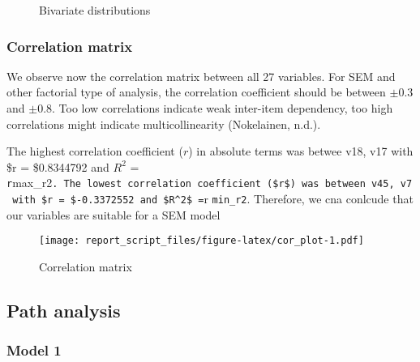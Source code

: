 \documentclass[
]{article}
\begin{document}
\begin{figure}

{\centering {}\newline{}

}

\caption{Bivariate distributions}\label{fig:bivariates}
\end{figure}

\hypertarget{correlation-matrix}{%
\subsubsection{Correlation matrix}\label{correlation-matrix}}

We observe now the correlation matrix between all 27 variables. For SEM
and other factorial type of analysis, the correlation coefficient should
be between \(\pm 0.3\) and \(\pm 0.8\). Too low correlations indicate
weak inter-item dependency, too high correlations might indicate
multicollinearity (Nokelainen, n.d.).

The highest correlation coefficient (\(r\)) in absolute terms was betwee
v18, v17 with \$r = \$0.8344792 and \(R^2\) =
\texttt{r}max\_r2\texttt{.\ The\ lowest\ correlation\ coefficient\ (\$r\$)\ was\ between\ v45,\ v7\ with\ \$r\ =\ \$-0.3372552\ and\ \$R\^{}2\$\ =}r
\texttt{min\_r2}. Therefore, we cna conlcude that our variables are
suitable for a SEM model

\begin{figure}
\centering
\texttt{[image: report\_script\_files/figure-latex/cor\_plot-1.pdf]}
\caption{Correlation matrix}
\end{figure}

\hypertarget{path-analysis}{%
\subsection{Path analysis}\label{path-analysis}}

\hypertarget{model-1}{%
\subsubsection{Model 1}\label{model-1}}
\end{document}
